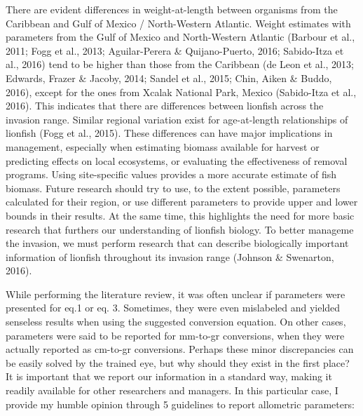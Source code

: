 \documentclass[12pt,]{article}
\begin{document}
There are evident differences in weight-at-length between organisms from
the Caribbean and Gulf of Mexico / North-Western Atlantic. Weight
estimates with parameters from the Gulf of Mexico and North-Western
Atlantic (Barbour et al., 2011; Fogg et al., 2013; Aguilar-Perera \&
Quijano-Puerto, 2016; Sabido-Itza et al., 2016) tend to be higher than
those from the Caribbean (de Leon et al., 2013; Edwards, Frazer \&
Jacoby, 2014; Sandel et al., 2015; Chin, Aiken \& Buddo, 2016), except
for the ones from Xcalak National Park, Mexico (Sabido-Itza et al.,
2016). This indicates that there are differences between lionfish across
the invasion range. Similar regional variation exist for age-at-length
relationships of lionfish (Fogg et al., 2015). These differences can
have major implications in management, especially when estimating
biomass available for harvest or predicting effects on local ecosystems,
or evaluating the effectiveness of removal programs. Using site-specific
values provides a more accurate estimate of fish biomass. Future
research should try to use, to the extent possible, parameters
calculated for their region, or use different parameters to provide
upper and lower bounds in their results. At the same time, this
highlights the need for more basic research that furthers our
understanding of lionfish biology. To better manageme the invasion, we
must perform research that can describe biologically important
information of lionfish throughout its invasion range (Johnson \&
Swenarton, 2016).

While performing the literature review, it was often unclear if
parameters were presented for eq.1 or eq. 3. Sometimes, they were even
mislabeled and yielded senseless results when using the suggested
conversion equation. On other cases, parameters were said to be reported
for mm-to-gr conversions, when they were actually reported as cm-to-gr
conversions. Perhaps these minor discrepancies can be easily solved by
the trained eye, but why should they exist in the first place? It is
important that we report our information in a standard way, making it
readily available for other researchers and managers. In this particular
case, I provide my humble opinion through 5 guidelines to report
allometric parameters:
\end{document}
